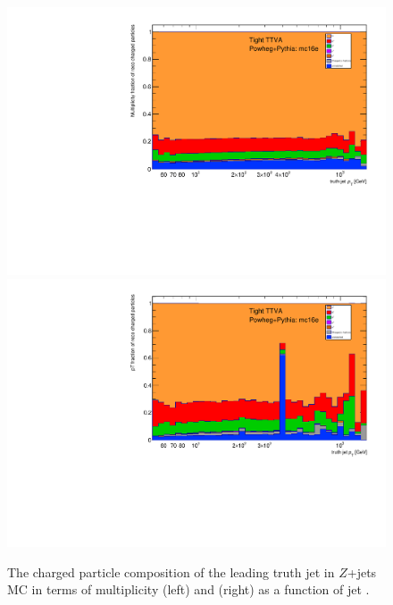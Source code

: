 \begin{figure}[tb]
\centering
\includegraphics[scale=0.38, page=2]{figures/jetcompstudy_MultiplicityFraction.pdf}
\includegraphics[scale=0.38, page=2]{figures/jet_comp_study_powheg_Tight_pTFraction_mc16e.pdf}%
\caption {The charged particle composition of the leading truth jet in \powpyt{} $Z$+jets MC in terms of multiplicity (left) and \pT{} (right) as a function of jet \pt{}.}
\label{fig:truthChargedJetComp}
\end{figure}


%
%



